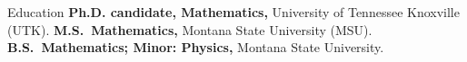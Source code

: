 \begin{rubric}{Education}
\entry*[2022 -- $\cdots$]%
	\textbf{Ph.D. candidate, Mathematics,} University of Tennessee Knoxville (UTK).
%
\entry*[2020 -- 2022]%
	\textbf{M.S.~Mathematics,} Montana State University (MSU).
\entry*[2016 -- 2020]%
	\textbf{B.S.~Mathematics; Minor: Physics,} Montana State University.
\end{rubric}